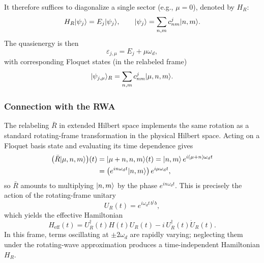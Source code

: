 It therefore suffices to diagonalize a single sector (e.g., $\mu=0$), denoted by $H_R$:
\begin{equation}
    H_R|\psi_j\rangle=E_j|\psi_j\rangle,
    \qquad
    |\psi_j\rangle=\sum_{n,m}c_{nm}^j|n,m\rangle.
\end{equation}
The quasienergy  is then
\begin{equation}
    \varepsilon_{j,\mu}=E_j+\mu\omega_d,
\end{equation}
with corresponding Floquet states (in the relabeled frame)
\begin{equation}
    |\psi_{j,\mu}\rangle_{R}=\sum_{n,m}c_{nm}^j|\mu,n,m\rangle.
\end{equation}
\subsubsection{Connection with the RWA}
The relabeling $\bar R$ in extended Hilbert space implements the same rotation as a standard rotating-frame transformation in the physical Hilbert space. Acting on a Floquet basis state and evaluating its time dependence gives
\begin{align}
    \bigl(\bar R|\mu,n,m\rangle\bigr)(t)
    &= |\mu+n,n,m\rangle(t)
     = |n,m\rangle\,e^{i(\mu+n)\omega_d t} \nonumber\\
    &= \bigl(e^{in\omega_d t}|n,m\rangle\bigr)\,e^{i\mu\omega_d t},
\end{align}
so $\bar R$ amounts to multiplying $|n,m\rangle$ by the phase $e^{in\omega_d t}$. This is precisely the action of the rotating-frame unitary
\begin{equation}
    U_R(t)=e^{i\omega_d t\, b^\dagger b},
\end{equation}
which yields the effective Hamiltonian
\begin{equation}
    H_{\mathrm{eff}}(t)=U_R^\dagger(t)H(t)U_R(t)-i\,U_R^\dagger(t)\dot U_R(t).
\end{equation}
In this frame, terms oscillating at $\pm 2\omega_d$ are rapidly varying; neglecting them under the rotating-wave approximation produces a time-independent Hamiltonian $H_R$.

